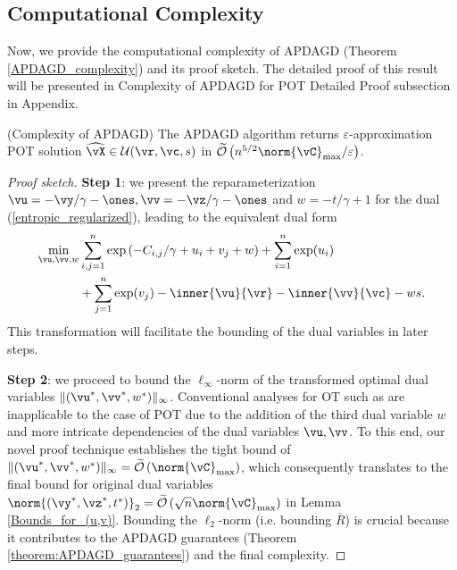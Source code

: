 \subsection{Computational Complexity}
Now, we provide the computational complexity of APDAGD (Theorem \ref{APDAGD_complexity}) and its proof sketch. The detailed proof of this result will be presented in Complexity of APDAGD for POT Detailed Proof subsection in Appendix.
\begin{theorem} \label{APDAGD_complexity} (Complexity of APDAGD)
    The APDAGD algorithm returns $\varepsilon$-approximation POT solution $\widehat{\vX} \in \mathcal{U}(\vr, \vc, s)$ in $\mathcal{\widetilde{O}}\left(n^{5/2} \norm{\vC}_{\max} / \varepsilon \right)$. 
\end{theorem}
\begin{proof}[Proof sketch] \textbf{Step 1}: we present the reparameterization $\vu = - \vy / \gamma - \ones, \vv = - \vz / \gamma - \ones$ and $w = -t / \gamma + 1$ for the dual (\ref{entropic_regularized}), leading to the equivalent dual form 
\begin{align*} 
        \min_{\vu, \vv, w} &\sum_{i, j=1}^{n} \exp \left(- C_{i, j} / \gamma + u_i + v_j + w \right) + \sum_{i=1}^{n} \exp(u_i) \\
        &+ \sum_{j=1}^{n} \exp(v_j) - \inner{\vu}{\vr} - \inner{\vv}{\vc} - ws.
\end{align*}
This transformation will facilitate the bounding of the dual variables in later steps. 

\textbf{Step 2}: we proceed to bound the $\ell_\infty$-norm of the transformed optimal dual variables $\|(\vu^\ast, \vv^\ast, w^\ast)\|_\infty$.  Conventional analyses for OT such as \citep{lin2019efficient} are inapplicable to the case of POT due to the addition of the third dual variable $w$ and more intricate dependencies of the dual variables $\vu, \vv$. To this end, our novel proof technique establishes the tight bound of $\|(\vu^\ast, \vv^\ast, w^\ast)\|_\infty = \mathcal{\widetilde{O}}\left( \norm{\vC}_{\max} \right)$, which consequently translates to the final bound for original dual variables $\norm{(\vy^\ast, \vz^\ast, t^\ast)}_2 = \mathcal{\widetilde{O}}\left(\sqrt{n} \norm{\vC}_{\max} \right)$ in Lemma \ref{Bounds_for_(u,v)}. Bounding the $\ell_2$-norm (i.e. bounding $\bar{R}$) is crucial because it contributes to the APDAGD guarantees (Theorem \ref{theorem:APDAGD_guarantees}) and the final complexity.


\end{proof}
